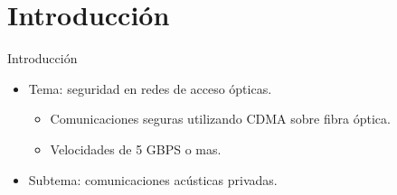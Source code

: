 \documentclass[aspectratio=169]{beamer}
\begin{document}
\section{Introducción}
\begin{frame}{Introducción}


\begin{itemize}
 \item Tema: seguridad en redes de acceso \color{red}ópticas\color{black}.
\begin{itemize}
 \item Comunicaciones seguras utilizando CDMA sobre fibra óptica.
 \item Velocidades de 5 GBPS o mas.
\end{itemize}
 \item Subtema: comunicaciones \color{red}acústicas \color{black} privadas.
\end{itemize}


  \begin{figure}[!t]
   \centering
   \qquad
   \qquad
  \label{fig:ImgOjo}
\end{figure}


\end{frame}
\end{document}
